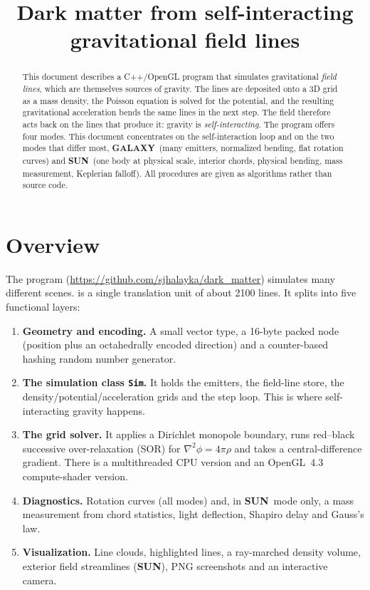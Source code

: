 \documentclass[12pt]{article}
\title{\textbf{Dark matter from self-interacting gravitational field lines}\\[4pt]}
\author{}
\date{}
\newcommand{\GALAXY}{\textcolor{galaxyc}{\textbf{\textsf{GALAXY}}}}
\newcommand{\SUN}{\textcolor{sunc}{\textbf{\textsf{SUN}}}}
\begin{document}
\maketitle

\begin{abstract}
This document describes a C++/OpenGL program that simulates gravitational \emph{field lines}, which are themselves sources of gravity. 
The lines are deposited onto a 3D grid as a mass density, the Poisson equation
is solved for the potential, and the resulting gravitational acceleration
bends the same lines in the next step. The field therefore acts back on the
lines that produce it: gravity is \emph{self-interacting}. The program offers
four modes. This document concentrates on the self-interaction loop and on
the two modes that differ most, \GALAXY\ (many emitters, normalized bending, flat rotation curves) and \SUN\ (one body at physical scale, interior chords, physical bending, mass measurement, Keplerian falloff). 
All procedures are given as algorithms rather than source code.
\end{abstract}


\section{Overview}

The program (\url{https://github.com/sjhalayka/dark_matter}) 
simulates many different scenes. is a single translation unit of 
about 2100 lines. It splits into five functional layers:

\begin{enumerate}
  \item \textbf{Geometry and encoding.} A small vector type, a 16-byte packed
        node (position plus an octahedrally encoded direction) and a
        counter-based hashing random number generator.
  \item \textbf{The simulation class \texttt{Sim}.} It holds the emitters, the
        field-line store, the density/potential/acceleration grids and the
        step loop. This is where self-interacting gravity happens.
  \item \textbf{The grid solver.} It applies a Dirichlet monopole boundary, runs
        red--black successive over-relaxation (SOR) for $\nabla^2\phi = 4\pi\rho$
        and takes a central-difference gradient. There is a multithreaded CPU
        version and an OpenGL~4.3 compute-shader version.
  \item \textbf{Diagnostics.} Rotation curves (all modes) and, in \SUN\ mode only,
        a mass measurement from chord statistics, light deflection, Shapiro delay
        and Gauss's law.
  \item \textbf{Visualization.} Line clouds, highlighted lines, a ray-marched
        density volume, exterior field streamlines (\SUN), PNG screenshots and
        an interactive camera.
\end{enumerate}
\end{document}
